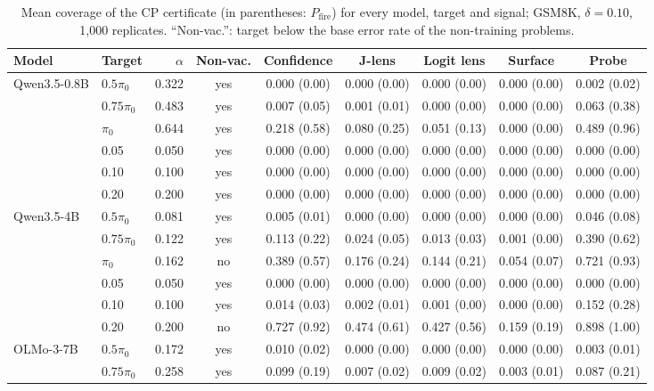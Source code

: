 \begin{table}[H]
\centering\small
\caption{Mean coverage of the CP certificate (in parentheses: $P_{\mathrm{fire}}$) for every model, target and signal; GSM8K, $\delta=0.10$, 1{,}000 replicates. ``Non-vac.'': target below the base error rate of the non-training problems.}
\label{tab:full}
\begin{tabular}{llrc ccccc}
\toprule
Model & Target & $\alpha$ & Non-vac. & Confidence & J-lens & Logit lens & Surface & Probe \\
\midrule
Qwen3.5-0.8B & $0.5\pi_0$ & 0.322 & yes & 0.000 (0.00) & 0.000 (0.00) & 0.000 (0.00) & 0.000 (0.00) & 0.002 (0.02) \\
 & $0.75\pi_0$ & 0.483 & yes & 0.007 (0.05) & 0.001 (0.01) & 0.000 (0.00) & 0.000 (0.00) & 0.063 (0.38) \\
 & $\pi_0$ & 0.644 & yes & 0.218 (0.58) & 0.080 (0.25) & 0.051 (0.13) & 0.000 (0.00) & 0.489 (0.96) \\
 & 0.05 & 0.050 & yes & 0.000 (0.00) & 0.000 (0.00) & 0.000 (0.00) & 0.000 (0.00) & 0.000 (0.00) \\
 & 0.10 & 0.100 & yes & 0.000 (0.00) & 0.000 (0.00) & 0.000 (0.00) & 0.000 (0.00) & 0.000 (0.00) \\
 & 0.20 & 0.200 & yes & 0.000 (0.00) & 0.000 (0.00) & 0.000 (0.00) & 0.000 (0.00) & 0.000 (0.00) \\
\addlinespace
Qwen3.5-4B & $0.5\pi_0$ & 0.081 & yes & 0.005 (0.01) & 0.000 (0.00) & 0.000 (0.00) & 0.000 (0.00) & 0.046 (0.08) \\
 & $0.75\pi_0$ & 0.122 & yes & 0.113 (0.22) & 0.024 (0.05) & 0.013 (0.03) & 0.001 (0.00) & 0.390 (0.62) \\
 & $\pi_0$ & 0.162 & no & 0.389 (0.57) & 0.176 (0.24) & 0.144 (0.21) & 0.054 (0.07) & 0.721 (0.93) \\
 & 0.05 & 0.050 & yes & 0.000 (0.00) & 0.000 (0.00) & 0.000 (0.00) & 0.000 (0.00) & 0.000 (0.00) \\
 & 0.10 & 0.100 & yes & 0.014 (0.03) & 0.002 (0.01) & 0.001 (0.00) & 0.000 (0.00) & 0.152 (0.28) \\
 & 0.20 & 0.200 & no & 0.727 (0.92) & 0.474 (0.61) & 0.427 (0.56) & 0.159 (0.19) & 0.898 (1.00) \\
\addlinespace
OLMo-3-7B & $0.5\pi_0$ & 0.172 & yes & 0.010 (0.02) & 0.000 (0.00) & 0.000 (0.00) & 0.000 (0.00) & 0.003 (0.01) \\
 & $0.75\pi_0$ & 0.258 & yes & 0.099 (0.19) & 0.007 (0.02) & 0.009 (0.02) & 0.003 (0.01) & 0.087 (0.21) \\

\end{tabular}
\end{table}
